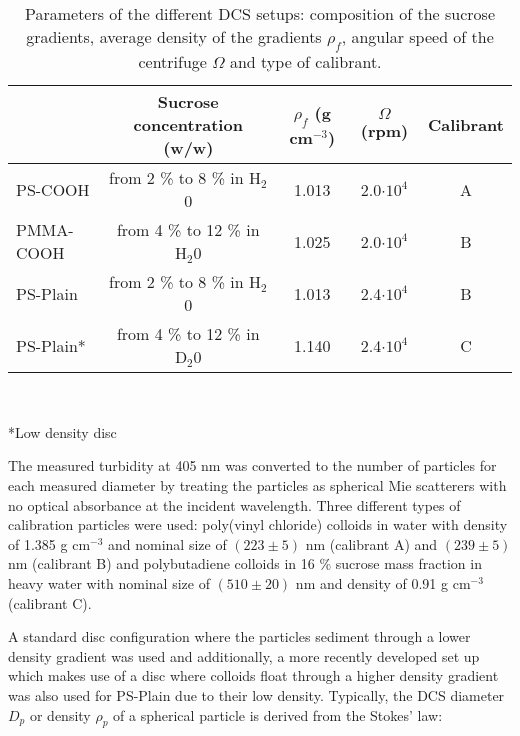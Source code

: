 \begin{table*}[]
\centering
\caption{Parameters of the different DCS setups: composition of the sucrose gradients, average density of the gradients $\rho_f$, angular speed of the centrifuge $\Omega$ and type of calibrant.}
\label{tab:DCSParameters}
\begin{tabular}{l|c|c|c|c|}
\cline{2-5}
\multicolumn{1}{c|}{}                         & Sucrose concentration (w/w)    & $\rho_f$ (g cm$^{-3}$) & $\Omega$ (rpm)  & Calibrant \\ \hline
\multicolumn{1}{|l|}{PS-COOH}    & from 2 \% to 8 \% in H$_2$0  & 1.013                  & 2.0$\cdot 10^4$                  & A         \\ \hline
\multicolumn{1}{|l|}{PMMA-COOH}  & from 4 \% to 12 \% in H$_2$0 & 1.025                  & 2.0$\cdot 10^4$                  & B         \\ \hline
\multicolumn{1}{|l|}{PS-Plain}      & from 2 \% to 8 \% in H$_2$0  & 1.013     & 2.4$\cdot 10^4$                  & B        \\ \hline
\multicolumn{1}{|l|}{PS-Plain*} & from 4 \% to 12 \% in D$_2$0 & 1.140     & 2.4$\cdot 10^4$                  & C         \\ \hline

\end{tabular}\\[0.3\baselineskip]
\begin{minipage}{15cm}
	\begin{raggedright}
	*\small{Low density disc}
	\end{raggedright}
\end{minipage}
\label{tab:composition}
\end{table*}

The measured turbidity at 405 nm was converted to the number of particles for each measured diameter by treating the particles as spherical Mie scatterers with no optical absorbance at the incident wavelength. Three different types of calibration particles were used: poly(vinyl chloride) colloids in water with density of 1.385 g cm$^{-3}$ and nominal size of $(223\pm5)$ nm (calibrant A) and $(239\pm5)$ nm (calibrant B) and polybutadiene colloids in 16 \% sucrose mass fraction in heavy water with nominal size of $(510\pm20)$ nm and density of 0.91 g cm$^{-3}$ (calibrant C). 

A standard disc configuration where the particles sediment through a lower density gradient was used and additionally, a more recently developed set up which makes use of a disc where colloids float through a higher density gradient was also used for PS-Plain due to their low density\citep{fitzpatrick_structure_1998}. Typically, the DCS diameter $D_p$ or density $\rho_p$ of a spherical particle is derived from the Stokes' law:

